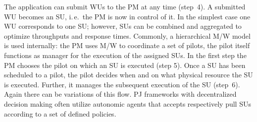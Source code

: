 \documentclass[conference,final]{IEEEtran}
\begin{document}
The application can submit WUs to the PM at any time (step~4). A submitted WU
becomes an SU, i.\,e.\ the PM is now in control of it. In the simplest case one
WU corresponds to one SU; however, SUs can be combined and aggregated to
optimize throughputs and response times. Commonly, a hierarchical M/W model is
used internally: the PM uses M/W to coordinate a set of pilots, the pilot itself
functions as manager for the execution of the assigned SUs. In the first step
the PM chooses the pilot on which an SU is executed (step 5). Once a SU has been
scheduled to a pilot, the pilot decides when and on what physical resource the
SU is executed. Further, it manages the subsequent execution of the SU (step~6).
Again there can be variations of this flow. PJ frameworks with decentralized
decision making often utilize autonomic agents that accepts respectively pull
SUs according to a set of defined policies.
\end{document}
